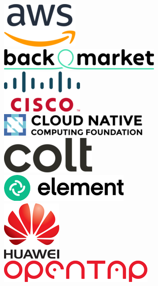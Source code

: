 \documentclass[aspectratio=169]{beamer}
\begin{document}
\begin{frame}
	\begin{columns}[t]
	\centering
		\includegraphics[scale=0.5]{images/aws.png} \\
		\vspace{0.6cm}
		\includegraphics[scale=0.3]{images/backmarket.png}\\
		\vspace{0.6cm}
		\includegraphics[scale=0.5]{images/cisco.png}\\
	\centering
		\includegraphics[scale=0.4]{images/cncf.png}\\
		\vspace{1cm}
		\includegraphics[scale=0.2]{images/colt.png}\\
		\vspace{1cm}
		\includegraphics[scale=0.5]{images/element.png}\\
	\centering
		\includegraphics[scale=0.4]{images/huawei.png}\\
		\vspace{0.7cm}
		\includegraphics[scale=0.5]{images/opentap.png}\\
	\end{columns}
\end{frame}
\end{document}
